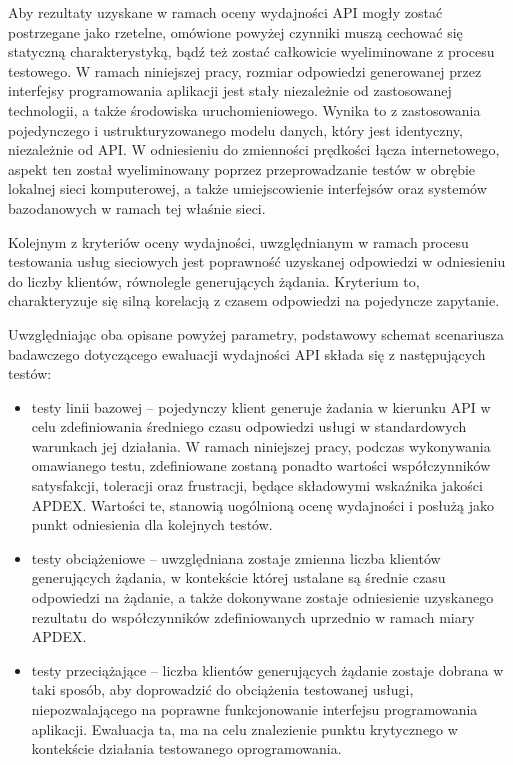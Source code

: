 Aby rezultaty uzyskane w ramach oceny wydajności API mogły zostać postrzegane jako rzetelne, omówione powyżej czynniki muszą cechować się statyczną charakterystyką, bądź też zostać całkowicie wyeliminowane z procesu testowego. W ramach niniejszej pracy, rozmiar odpowiedzi generowanej przez interfejsy programowania aplikacji jest stały niezależnie od zastosowanej technologii, a także środowiska uruchomieniowego. Wynika to z zastosowania pojedynczego i ustrukturyzowanego modelu danych, który jest identyczny, niezależnie od API. W odniesieniu do zmienności prędkości łącza internetowego, aspekt ten został wyeliminowany poprzez przeprowadzanie testów w obrębie lokalnej sieci komputerowej, a także umiejscowienie interfejsów oraz systemów bazodanowych w ramach tej właśnie sieci.

Kolejnym z kryteriów oceny wydajności, uwzględnianym w ramach procesu testowania usług sieciowych jest poprawność uzyskanej odpowiedzi w odniesieniu do liczby klientów, równolegle generujących żądania. Kryterium to, charakteryzuje się silną korelacją z czasem odpowiedzi na pojedyncze zapytanie.

Uwzględniając oba opisane powyżej parametry, podstawowy schemat scenariusza badawczego dotyczącego ewaluacji wydajności API składa się z następujących testów:
\begin{itemize}
    \item testy linii bazowej -- pojedynczy klient generuje żadania w kierunku API w celu zdefiniowania średniego czasu odpowiedzi usługi w standardowych warunkach jej działania. W ramach niniejszej pracy, podczas wykonywania omawianego testu, zdefiniowane zostaną ponadto wartości współczynników satysfakcji, toleracji oraz frustracji, będące składowymi wskaźnika jakości APDEX. Wartości te, stanowią uogólnioną ocenę wydajności i posłużą jako punkt odniesienia dla kolejnych testów.
    \item testy obciążeniowe -- uwzględniana zostaje zmienna liczba klientów generujących żądania, w kontekście której ustalane są średnie czasu odpowiedzi na żądanie, a także dokonywane zostaje odniesienie uzyskanego rezultatu do współczynników zdefiniowanych uprzednio w ramach miary APDEX.
    \item testy przeciążające -- liczba klientów generujących żądanie zostaje dobrana w taki sposób, aby doprowadzić do obciążenia testowanej usługi, niepozwalającego na poprawne funkcjonowanie interfejsu programowania aplikacji. Ewaluacja ta, ma na celu znalezienie punktu krytycznego w kontekście działania testowanego oprogramowania.
\end{itemize}

